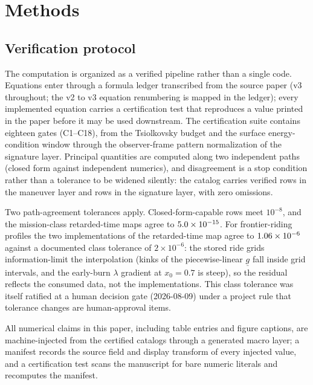 \documentclass[11pt]{article}
\begin{document}
\begin{table}[t]
\centering
\caption{The three-tier constraint system on $\lambda = aR$.}
\label{tab:tiers}

\end{table}

\section{Methods}\label{sec:methods}

\subsection{Verification protocol}

The computation is organized as a verified pipeline rather than a single
code. Equations enter through a formula ledger transcribed from the source
paper (v3 throughout; the v2 to v3 equation renumbering is mapped in the
ledger); every implemented equation carries a certification test that
reproduces a value printed in the paper before it may be used downstream.
The certification suite contains eighteen gates (C1--C18), from the
Tsiolkovsky budget and the surface energy-condition window through the
observer-frame pattern normalization of the signature layer. Principal
quantities are computed along two independent paths (closed form against
independent numerics), and disagreement is a stop condition rather than a
tolerance to be widened silently: the catalog carries \NmGRowsP{} verified
rows in the maneuver layer and \NmSigRows{} rows in the signature layer,
with zero omissions.

Two path-agreement tolerances apply. Closed-form-capable rows meet
$10^{-8}$, and the mission-class retarded-time maps agree to
$5.0\times10^{-15}$. For frontier-riding profiles the two implementations of
the retarded-time map agree to $1.06\times10^{-6}$ against a documented class
tolerance of $2\times10^{-6}$: the stored ride grids information-limit the
interpolation (kinks of the piecewise-linear $\underline{g}$ fall inside
grid intervals, and the early-burn $\lambda$ gradient at $x_0=0.7$ is
steep), so the residual reflects the consumed data, not the
implementations. This class tolerance was itself ratified at a human
decision gate (2026-08-09) under a project rule that tolerance changes are
human-approval items.

All numerical claims in this paper, including table entries and figure
captions, are machine-injected from the certified catalogs through a
generated macro layer; a manifest records the source field and display
transform of every injected value, and a certification test scans the
manuscript for bare numeric literals and recomputes the manifest.
\end{document}
